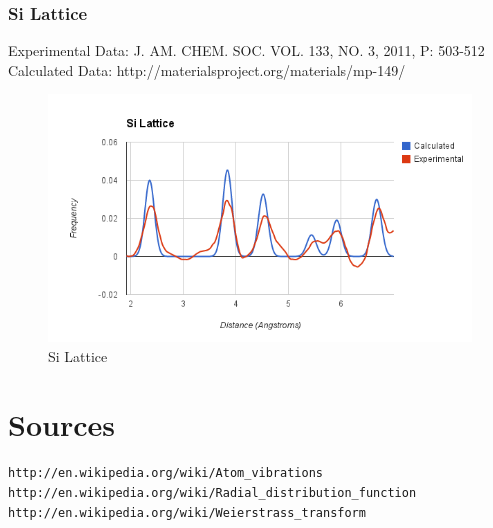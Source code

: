 \documentclass[12pt,letterpaper]{article}
\begin{document}
\subsubsection{Si Lattice}
\noindent Experimental Data: J. AM. CHEM. SOC. VOL. 133, NO. 3, 2011, P:
503-512\\
\noindent Calculated Data: http://materialsproject.org/materials/mp-149/ \\
\begin{figure}[h]
  \begin{center}
    \includegraphics[scale=0.7]{figs/si_lattice_comparison.png}
    \caption{Si Lattice}
  \end{center}
\end{figure}

\pagebreak

\section{Sources}
\begin{verbatim}
http://en.wikipedia.org/wiki/Atom_vibrations
http://en.wikipedia.org/wiki/Radial_distribution_function
http://en.wikipedia.org/wiki/Weierstrass_transform
\end{verbatim}

\end{document}
